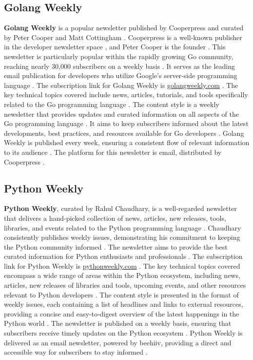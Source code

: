 \documentclass[11pt]{article}
\begin{document}
\subsection{Golang Weekly}
\textbf{Golang Weekly} is a popular newsletter published by Cooperpress and curated by Peter Cooper and Matt Cottingham \citep{ctoclub2025prognews}. Cooperpress is a well-known publisher in the developer newsletter space \citep{cooperpress2025pubs}, and Peter Cooper is the founder \citep{cooperpress2025team}. This newsletter is particularly popular within the rapidly growing Go community, reaching nearly 30,000 subscribers on a weekly basis \citep{cooperpress2025pubs}. It serves as the leading email publication for developers who utilize Google's server-side programming language \citep{cooperpress2025pubs}. The subscription link for Golang Weekly is \url{golangweekly.com} \citep{ctoclub2025prognews}. The key technical topics covered include news, articles, tutorials, and tools specifically related to the Go programming language \citep{ctoclub2025prognews}. The content style is a weekly newsletter that provides updates and curated information on all aspects of the Go programming language \citep{ctoclub2025prognews}. It aims to keep subscribers informed about the latest developments, best practices, and resources available for Go developers \citep{cooperpress2025pubs}. Golang Weekly is published every week, ensuring a consistent flow of relevant information to its audience \citep{ctoclub2025prognews}. The platform for this newsletter is email, distributed by Cooperpress \citep{golangweekly2025site}.

\subsection{Python Weekly}
\textbf{Python Weekly}, curated by Rahul Chaudhary, is a well-regarded newsletter that delivers a hand-picked collection of news, articles, new releases, tools, libraries, and events related to the Python programming language \citep{ctoclub2025prognews}. Chaudhary consistently publishes weekly issues, demonstrating his commitment to keeping the Python community informed \citep{pythonweekly2025site}. The newsletter aims to provide the best curated information for Python enthusiasts and professionals \citep{pythonweekly2025main}. The subscription link for Python Weekly is \url{pythonweekly.com} \citep{ctoclub2025prognews}. The key technical topics covered encompass a wide range of areas within the Python ecosystem, including news, articles, new releases of libraries and tools, upcoming events, and other resources relevant to Python developers \citep{ctoclub2025prognews}. The content style is presented in the format of weekly issues, each containing a list of headlines and links to external resources, providing a concise and easy-to-digest overview of the latest happenings in the Python world \citep{pythonweekly2025site}. The newsletter is published on a weekly basis, ensuring that subscribers receive timely updates on the Python ecosystem \citep{ctoclub2025prognews}. Python Weekly is delivered as an email newsletter, powered by beehiiv, providing a direct and accessible way for subscribers to stay informed \citep{pythonweekly2025site}.
\end{document}
